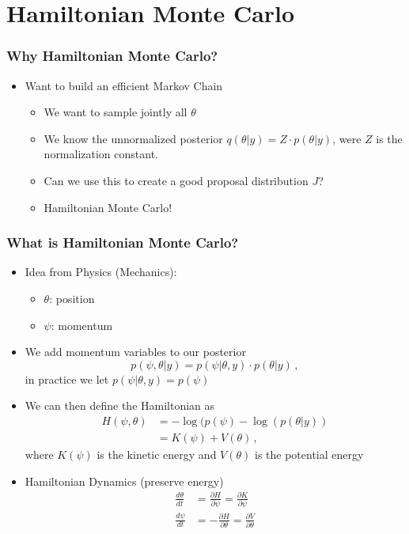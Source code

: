 \documentclass[10pt]{beamer}
\newcommand{\uured}[1]{\textcolor{uured}{#1}}
\begin{document}

\section{Hamiltonian Monte Carlo}
\frame{\sectionpage}

\begin{frame}
\frametitle{Why Hamiltonian Monte Carlo?}

\begin{itemize}
\item Want to build an \uured{efficient} Markov Chain
\begin{itemize}
\item We want to sample jointly all $\theta$
\item We know the \uured{unnormalized} posterior $q(\theta|y)=Z \cdot p(\theta|y)$, were $Z$ is the normalization constant.
\item Can we use this to create a good \uured{proposal} distribution $J$?
\pause
\item \uured{Hamiltonian Monte Carlo}!
\end{itemize}
\end{itemize}

\end{frame}


\begin{frame}
\frametitle{What is Hamiltonian Monte Carlo?}

\begin{itemize}
\item Idea from Physics (Mechanics):
\begin{itemize}
\item $\theta$: position
\item $\psi$: momentum
\end{itemize}

\item We add momentum variables to our posterior
\[
 p(\psi,\theta | y) = p(\psi | \theta , y) \cdot p(\theta | y)\,,
\]
in practice we let $p(\psi | \theta , y) = p(\psi)$

\item We can then define the Hamiltonian as
\begin{align}
H(\psi, \theta)  & = - \log(p(\psi) - \log(p(\theta | y))\\
 & = K(\psi) + V(\theta)\,,
\end{align}
where $K(\psi)$ is the \uured{kinetic} energy and $V(\theta)$ is the \uured{potential} energy
\item Hamiltonian Dynamics (\uured{preserve energy})
\begin{align}
\frac{d\theta}{dt} &=  \frac{\partial H}{\partial \psi} = \frac{\partial K}{\partial \psi}\\
\frac{d\psi}{dt} &=  - \frac{\partial H}{\partial \theta} = \frac{\partial V}{\partial \theta}
\end{align}

\end{itemize}

\end{frame}
\end{document}
